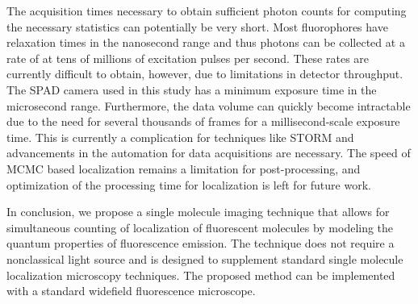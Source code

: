 The acquisition times necessary to obtain sufficient photon counts for computing the necessary statistics can potentially be very short. Most fluorophores have relaxation times in the nanosecond range and thus photons can be collected at a rate of at tens of millions of excitation pulses per second. These rates are currently difficult to obtain, however, due to limitations in detector throughput. The SPAD camera used in this study has a minimum exposure time in the microsecond range. Furthermore, the data volume can quickly become intractable due to the need for several thousands of frames for a millisecond-scale exposure time. This is currently a complication for techniques like STORM and advancements in the automation for data acquisitions are necessary. The speed of MCMC based localization remains a limitation for post-processing, and optimization of the processing time for localization is left for future work. 

In conclusion, we propose a single molecule imaging technique that allows for simultaneous counting of localization of fluorescent molecules by modeling the quantum properties of fluorescence emission. The technique does not require a nonclassical light source and is designed to supplement standard single molecule localization microscopy techniques. The proposed method can be implemented with a standard widefield fluorescence microscope.


